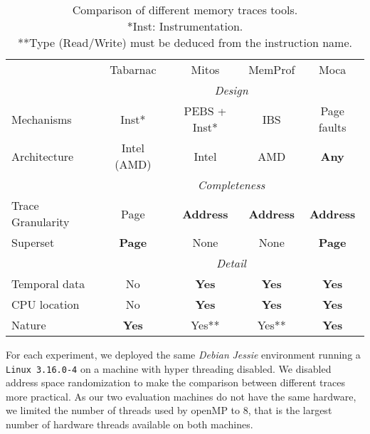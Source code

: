 \begin{table}[htb]
    \centering
    \begin{tabular}{lcccc}
        \toprule
            & Tabarnac & Mitos & MemProf & Moca \\
            \cmidrule(lr){2-5}
            & \multicolumn{4}{c}{\emph{Design}} \\
            \cmidrule(lr){2-5}
            Mechanisms   & Inst* & PEBS + Inst* & IBS & Page faults \\
            Architecture & Intel (AMD) & Intel & AMD & \textbf{Any} \\
            \cmidrule(lr){2-5}
            & \multicolumn{4}{c}{\emph{Completeness}} \\
            \cmidrule(lr){2-5}
            Trace Granularity & Page          & \textbf{Address} & \textbf{Address} & \textbf{Address} \\
            Superset          & \textbf{Page} & None             & None             & \textbf{Page} \\
            \cmidrule(lr){2-5}
            & \multicolumn{4}{c}{\emph{Detail}} \\
            \cmidrule(lr){2-5}
            Temporal data & No          & \textbf{Yes} & \textbf{Yes} & \textbf{Yes} \\
            CPU location  & No          & \textbf{Yes} & \textbf{Yes} & \textbf{Yes} \\
            Nature        &\textbf{Yes} & Yes**         & Yes**         & \textbf{Yes} \\
        \bottomrule
    \end{tabular}
    \caption[Comparison of different memory traces tools.]
    {Comparison of different memory traces tools.\\
        *Inst: Instrumentation.\\
        **Type (Read/Write) must be deduced from the instruction name.}
        \label{tab:tools-comp}
\end{table}


For each experiment, we deployed the same \emph{Debian} \emph{Jessie}
environment running a \texttt{Linux 3.16.0-4} on a machine with hyper threading
disabled. We disabled address space randomization to make the comparison between different
traces more practical.
As our two evaluation machines do not have the same hardware,
we limited the number of threads used by openMP to $8$,
that is the largest number of hardware threads available on both machines.


